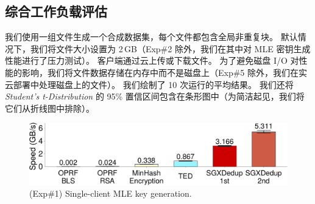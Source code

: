\subsection{综合工作负载评估}
\label{subsec:synthetic}


我们使用一组文件生成一个合成数据集，每个文件都包含全局非重复块。 默认情况下，我们将文件大小设置为 2\,GB（Exp\#2 除外，我们在其中对 MLE 密钥生成性能进行了压力测试）。 客户端通过云上传或下载文件。 为了避免磁盘 I/O 对性能的影响，我们将文件数据存储在内存中而不是磁盘上（Exp\#5 除外，我们在实云部署中处理磁盘上的文件）。 我们绘制了 10 次运行的平均结果。 我们还将 \textit{ Student's t-Distribution} 的 95\% 置信区间包含在条形图中（为简洁起见，我们将它们从折线图中排除）。


\begin{figure}[!htb]
\centering
\includegraphics[width=\textwidth]{pic/sgxdedup/expa2_keyGenPerformance.pdf}
\vspace{-12pt}
\caption{(Exp\#1) Single-client MLE key generation.}
\label{fig:keygen-comparison}
\end{figure}

